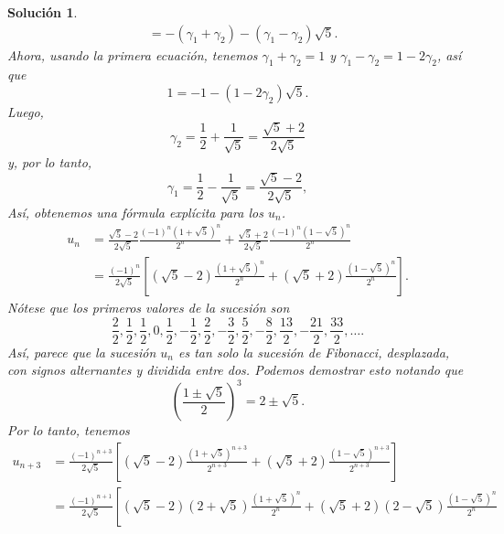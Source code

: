 \documentclass[11pt,letterpaper]{article}
\newtheorem*{sol}{Solución}
\begin{document}
\begin{sol}
\begin{align}
    &= -(\gamma_1+\gamma_2) -(\gamma_1-\gamma_2) \sqrt{5}
  .\end{align}
  Ahora, usando la primera ecuación, tenemos $\gamma_1+\gamma_2=1$ y
  $\gamma_1-\gamma_2=1-2\gamma_2$, así que
  \begin{equation}
    1 = -1 -(1-2\gamma_2) \sqrt{5}
  .\end{equation}
  Luego,
  \begin{equation}
     \gamma_2
     = \frac{1}{2} + \frac{1}{\sqrt 5}
     = \frac{\sqrt 5 + 2}{2\sqrt 5}
  \end{equation}
  y, por lo tanto,
  \begin{equation}
    \gamma_1
    = \frac{1}{2}- \frac{1}{\sqrt 5}
     = \frac{\sqrt 5 - 2}{2\sqrt 5}
  ,\end{equation}
  Así, obtenemos una fórmula explícita para los $u_n$.
  \begin{align}
    u_n
    &=
    \frac{\sqrt 5 - 2}{2\sqrt 5}
    \frac{(-1)^{n}(1 + \sqrt{5})^{n}}{2^n}
    + \frac{\sqrt 5 + 2}{2\sqrt 5}
      \frac{(-1)^{n}(1 - \sqrt{5})^{n}}{2^n}
      \\
    &=
    \frac{(-1)^{n}}{2\sqrt 5}
    \left[
    (\sqrt 5 - 2)
    \frac{(1 + \sqrt{5})^{n}}{2^n}
    + (\sqrt 5 + 2)
      \frac{(1 - \sqrt{5})^{n}}{2^n}
      \right]
  .\end{align}
  Nótese que los primeros valores de la sucesión son
  \begin{equation}
    \frac{2}{2}, \frac{1}{2}, \frac{1}{2}, 0, \frac{1}{2},
    -\frac{1}{2}, \frac{2}{2},
    -\frac{3}{2}, \frac{5}{2}, -\frac{8}{2}, \frac{13}{2},
    -\frac{21}{2}, \frac{33}{2}, \dots
  .\end{equation}
  Así, parece que la sucesión $u_n$ es tan solo la sucesión de
  Fibonacci, desplazada, con signos alternantes y dividida entre dos.
  Podemos demostrar esto notando que
  \begin{equation}
    \left(
      \frac{1\pm\sqrt 5}{2}
    \right)^{3}
    = 2 \pm \sqrt 5
  .\end{equation}
  Por lo tanto, tenemos
  \begin{align}
    u_{n+3}
    &=
      \frac{(-1)^{n+3}}{2\sqrt 5}
      \left[
      (\sqrt 5 - 2)
      \frac{(1 + \sqrt{5})^{n+3}}{2^{n+3}}
      + (\sqrt 5 + 2)
      \frac{(1 - \sqrt{5})^{n+3}}{2^{n+3}}
      \right]
      \\
    &=
      \frac{(-1)^{n+1}}{2\sqrt 5}
      \left[
      (\sqrt 5 - 2)
      (2+\sqrt 5)
      \frac{(1 + \sqrt{5})^{n}}{2^{n}}
      + (\sqrt 5 + 2)
      (2-\sqrt 5)
      \frac{(1 - \sqrt{5})^{n}}{2^{n}}

\end{align}
\end{sol}
\end{document}
